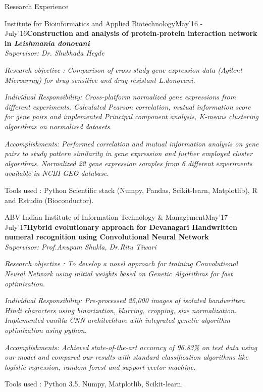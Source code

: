 \documentclass{resume} %
\begin{document}
\begin{rSection}{Research Experience}

\begin{rSubsection}{Institute for Bioinformatics and Applied Biotechnology}{May'16 - July'16}{\textbf{Construction and analysis of protein-protein interaction network in \textit{Leishmania donovani}
} \\
 \emph{\it Supervisor: Dr. Shubhada Hegde} \\[-0.6cm]}{}
	\item \it {Research objective} : Comparison of cross study gene expression data (Agilent Microarray) for drug sensitive and drug resistant \textit{L.donovani}.
    \item \it {Individual Responsibility}: Cross-platform normalized gene expressions from different experiments. Calculated Pearson correlation, mutual information score for gene pairs and implemented Principal component analysis, K-means clustering algorithms on normalized datasets.	
	\item \it {Accomplishments:} Performed correlation and mutual information analysis on gene pairs to study pattern similarity in gene expression and further employed cluster algorithms. Normalized 22 gene expression samples from 6 different experiments available in NCBI GEO database.
	\item Tools used : Python Scientific stack (Numpy, Pandas, Scikit-learn, Matplotlib), R and Rstudio (Bioconductor).
\end{rSubsection}

\begin{rSubsection}{ABV Indian Institute of Information Technology \& Management}{May'17 - July'17}{\textbf{Hybrid evolutionary approach
for Devanagari Handwritten numeral recognition using Convolutional Neural Network} \\
 \emph{\it Supervisor: Prof.Anupam Shukla, \hspace{0.2cm} Dr.Ritu Tiwari} \\[-0.6cm]}{}
	\item \it {Research objective} : To develop a novel approach for training Convolutional Neural Network using initial weights based on Genetic Algorithms for fast optimization. 
    \item \it {Individual Responsibility}: Pre-processed 25,000 images of isolated handwritten Hindi characters using binarization, blurring, cropping, size normalization. Implemented vanilla CNN architechture with integrated genetic algorithm optimization using python.
	\item \it {Accomplishments:} Achieved state-of-the-art accuracy of 96.83\% on test data using our model and compared our results with standard classification algorithms like logistic regression, random forest and support vector machine.
	\item Tools used : Python 3.5, Numpy, Matplotlib, Scikit-learn.
\end{rSubsection}



\end{rSection}
\end{document}

